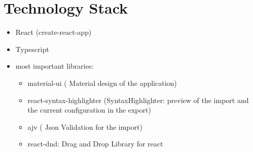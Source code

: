 \section{Technology Stack}
\label{sec:tech_stack}

\begin{itemize}
    \item React (create-react-app)
    \item Typescript
    \item most important libraries: 
        \begin{itemize}
            \item material-ui ( Material design of the application)
            \item react-syntax-highlighter (SyntaxHighlighter: preview of the import and the current configuration in the export)
            \item ajv ( Json Validation for the import)
            \item react-dnd: Drag and Drop Library for react
        \end{itemize}
\end{itemize}

\newpage